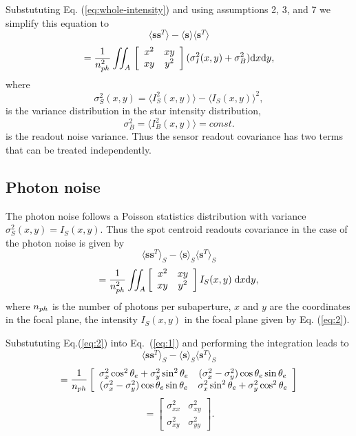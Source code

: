 Substututing Eq. (\ref{eq:whole-intensity}) and using assumptions 2, 3, and 7
we simplify this equation to
\begin{equation}
  \label{eq:13}
  \langle \bm{s} \bm{s}^{T} \rangle -
  \langle \bm{s} \rangle \langle \bm{s}^{T} \rangle
\end{equation}
$$
 = {1 \over n_{ph}^2} \iint_A{}
   \left[
   \begin{array}{cc}
	   x^{2} & xy    \\
	   xy    & y^{2}
	 \end{array}
   \right]
   (\sigma_{I}^{2}(x,y)+\sigma_{B}^{2})
   {\rm d}x{\rm d}y,
$$
where
$$
  \sigma_{S}^{2}(x,y) =
  \langle I_{S}^{2}(x,y) \rangle - \langle I_{S}(x,y) \rangle^{2},
$$
is the variance distribution in the star intensity distribution,
$$
  \sigma_{B}^{2} = \langle I^{2}_{B}(x,y) \rangle = const.
$$
is the readout noise variance. Thus the sensor readout covariance has two
terms that can be treated independently.

\subsection{Photon noise}
\label{sec:photon-noise}

The photon noise follows a Poisson statistics distribution with variance
$\sigma_{S}^{2}(x,y) = I_{S}(x,y)$.
Thus the spot centroid readouts covariance in the case of
the photon noise is given by
\begin{equation}
  \label{eq:1}
  \langle \bm{s} \bm{s}^{T} \rangle_{S} -
  \langle \bm{s} \rangle_{S} \langle \bm{s}^{T} \rangle_{S}
\end{equation}
$$ = {1 \over n_{ph}^2} \iint_{A}
   \left[
   \begin{array}{cc}
	   x^{2} & xy \\
	   xy    & y^{2}
	 \end{array}
   \right]
   I_{S}(x,y) \;{\rm d}x {\rm d}y,
$$
where $n_{ph}$ is the number of photons per subaperture, $x$ and $y$ are the
coordinates in the focal plane,
the intensity $I_{S}(x,y)$ in the focal plane given by Eq. (\ref{eq:2}).

Substututing Eq.(\ref{eq:2}) into Eq.~(\ref{eq:1}) and performing the
integration leads to
\begin{equation}
  \label{eq:4}
  \langle \bm{s} \bm{s}^{T} \rangle_{S} -
  \langle \bm{s} \rangle_{S} \langle \bm{s}^{T} \rangle_{S}
\end{equation}
$$
  = {1 \over n_{ph}}
  \left[
  \begin{array}{cc}
	  \sigma_{x}^{2} \cos^{2} \theta_{e} + \sigma_{y}^{2} \sin^{2} \theta_{e} &
	  (\sigma_{x}^{2}-\sigma_{y}^{2}) \cos \theta_{e} \sin \theta_{e} \\
	  (\sigma_{x}^{2}-\sigma_{y}^{2}) \cos \theta_{e} \sin \theta_{e} &
	  \sigma_{x}^{2} \sin^{2} \theta_{e} + \sigma_{y}^{2} \cos^{2} \theta_{e}
	\end{array}
  \right]
$$
$$
  =
  \left[
  \begin{array}{cc}
	  \sigma^{2}_{xx} & \sigma^{2}_{xy} \\
	  \sigma^{2}_{xy} & \sigma^{2}_{yy}
	\end{array}
  \right].
$$

